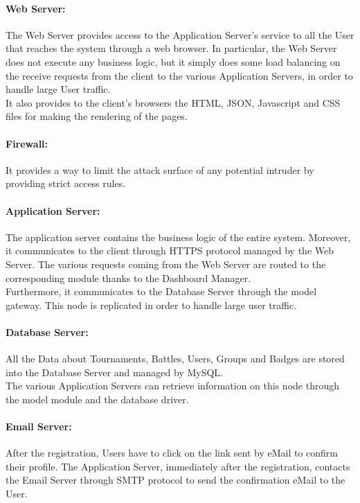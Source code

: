 \paragraph{Web Server:}
The Web Server provides access to the Application Server’s service to all the User that reaches the system through a web browser. In particular, the Web Server does not execute any business logic, but it simply does some load balancing on the receive requests from the client to the various Application Servers, in order to handle large User traffic.\\
It also provides to the client's browsers the HTML, JSON, Javascript and CSS files for making the rendering of the pages.

\paragraph{Firewall:}
It provides a way to limit the attack surface of any potential intruder by providing strict access rules.

\paragraph{Application Server:}
The application server contains the business logic of the entire system. Moreover, it communicates to the client through HTTPS protocol managed by the Web Server. The various requests coming from the Web Server are routed to the corresponding module thanks to the Dashboard Manager.\\
Furthermore, it communicates to the Database Server through the model gateway. This node is replicated in order to handle large user traffic.

\paragraph{Database Server:}
All the Data about Tournaments, Battles, Users, Groups and Badges are stored into the Database Server and managed by MySQL.\\
The various Application Servers can retrieve information on this node through the model module and the database driver.

\paragraph{Email Server:}
After the registration, Users have to click on the link sent by eMail to confirm their profile. The Application Server, immediately after the registration, contacts the Email Server through SMTP protocol to send the confirmation eMail to the User.

